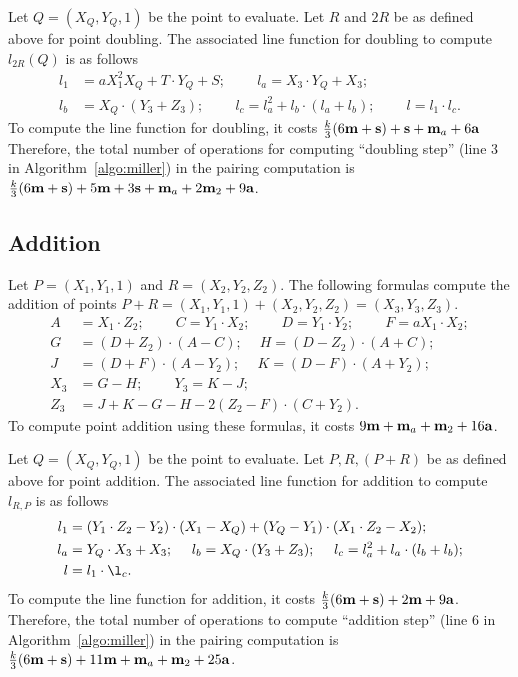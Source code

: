 Let $Q = (X_Q, Y_Q, 1)$ be the point to evaluate.
Let $R$ and $2R$ be as defined above for point doubling.
The associated line function for doubling
to compute $l_{2R}(Q)$ is as follows
\begin{align*}
l_1 &= a X_1^2 X_Q + T \cdot Y_Q + S;\		\qquad
l_a = X_3 \cdot Y_Q + X_3;			\\
l_b &= X_Q \cdot (Y_3 + Z_3);\			\qquad
l_c = l_a^2 + l_b \cdot (l_a + l_b);\		\qquad
l = l_1 \cdot l_c.
\end{align*}
To compute the line function for doubling,
it costs 
$\frac{k}{3}(6\textbf{m} + \textbf{s}) + \textbf{s} + \textbf{m}_{a} + 6\textbf{a}$
Therefore, the total number of operations for computing ``doubling step''
({line 3} in Algorithm~\ref{algo:miller}) in the pairing computation is
$\frac{k}{3}(6\textbf{m} + \textbf{s}) + 5\textbf{m} +3\textbf{s} + \textbf{m}_{a} + 2\textbf{m}_{2} + 9\textbf{a}$.



\subsection{Addition}
Let $P = (X_1,Y_1,1)$ and $R = (X_2,Y_2,Z_2)$.
The following formulas compute the addition of points
$P + R = (X_1,Y_1,1) + (X_2,Y_2,Z_2) = (X_3,Y_3,Z_3)$.
\begin{align*}
A &= X_1 \cdot Z_2;\	\qquad
C = Y_1 \cdot X_2;\	\qquad
D = Y_1 \cdot Y_2;\	\qquad
F = a X_1 \cdot X_2;\\
G &= (D + Z_2) \cdot (A - C);\	\quad
H = (D - Z_2) \cdot (A + C);\\
J &= (D + F) \cdot (A - Y_2);\	\quad
K = (D - F) \cdot (A + Y_2);\\
X_3 &= G - H;\	\qquad
Y_3 = K - J;\\
Z_3 &= J + K - G - H - 2(Z_2 - F) \cdot (C + Y_2).
\end{align*}
To compute point addition using these formulas,
it costs $9\textbf{m} + \textbf{m}_{a} + \textbf{m}_{2} + 16\textbf{a}$.

Let $Q = (X_Q,Y_Q,1)$ be the point to evaluate.
Let $P,R,(P+R)$ be as defined above for point addition.
The associated line function for addition
to compute $l_{R,P}$ is as follows
\begin{align*}
l_1 &= (Y_1 \cdot Z_2 - Y_2) \cdot (X_1 - X_Q) + (Y_Q - Y_1) \cdot (X_1 \cdot Z_2 - X_2);\\
l_a &= Y_Q \cdot X_3 + X_3;\	\quad
l_b = X_Q \cdot (Y_3 + Z_3);\	\quad
l_c = l_a^2 + l_a \cdot (l_b + l_b);\\
l &= l_1 \cdot \l_c.
\end{align*}
To compute the line function for addition,
it costs
$\frac{k}{3}(6\textbf{m} + \textbf{s}) + 2\textbf{m} + 9\textbf{a}$.
Therefore, the total number of operations to compute ``addition step''
({line 6} in Algorithm~\ref{algo:miller}) in the pairing computation is
$\frac{k}{3}(6\textbf{m} + \textbf{s}) + 11\textbf{m} + \textbf{m}_{a} + \textbf{m}_{2} + 25\textbf{a}$.



